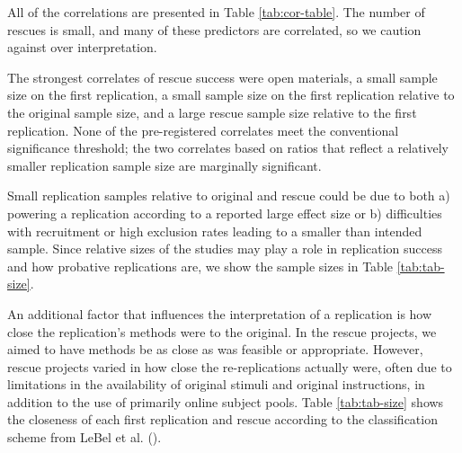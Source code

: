 \documentclass[
  english,
  a4paper,
]{article}
\begin{document}
All of the correlations are presented in Table \ref{tab:cor-table}.
The number of rescues is small, and many of these predictors are correlated, so we caution against over interpretation.

The strongest correlates of rescue success were open materials, a small sample size on the first replication, a small sample size on the first replication relative to the original sample size, and a large rescue sample size relative to the first replication.
None of the pre-registered correlates meet the conventional significance threshold; the two correlates based on ratios that reflect a relatively smaller replication sample size are marginally significant.

Small replication samples relative to original and rescue could be due to both a) powering a replication according to a reported large effect size or b) difficulties with recruitment or high exclusion rates leading to a smaller than intended sample.
Since relative sizes of the studies may play a role in replication success and how probative replications are, we show the sample sizes in Table \ref{tab:tab-size}.

An additional factor that influences the interpretation of a replication is how close the replication's methods were to the original.
In the rescue projects, we aimed to have methods be as close as was feasible or appropriate. However, rescue projects varied in how close the re-replications actually were, often due to limitations in the availability of original stimuli and original instructions, in addition to the use of primarily online subject pools.
Table \ref{tab:tab-size} shows the closeness of each first replication and rescue according to the classification scheme from LeBel et al. ().
\end{document}
